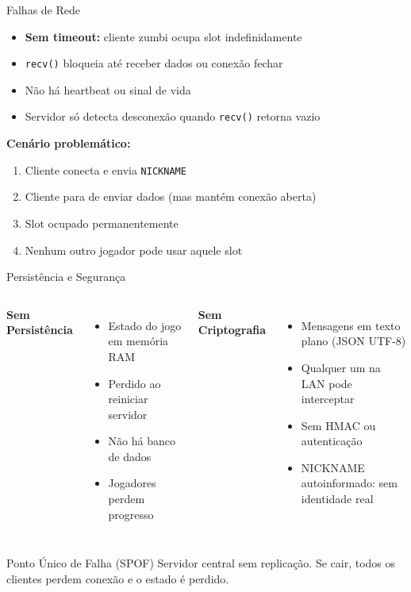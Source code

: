 \documentclass[aspectratio=169]{beamer}
\begin{document}
\begin{frame}{Falhas de Rede}
  \begin{itemize}
    \item \textbf{Sem timeout:} cliente zumbi ocupa slot indefinidamente
    \item \texttt{recv()} bloqueia at\'e receber dados ou conex\~ao fechar
    \item N\~ao h\'a heartbeat ou sinal de vida
    \item Servidor s\'o detecta desconex\~ao quando \texttt{recv()} retorna vazio
  \end{itemize}
  \vfill
  \textbf{Cen\'ario problem\'atico:}
  \begin{enumerate}
    \item Cliente conecta e envia \texttt{NICKNAME}
    \item Cliente para de enviar dados (mas mant\'em conex\~ao aberta)
    \item Slot ocupado permanentemente
    \item Nenhum outro jogador pode usar aquele slot
  \end{enumerate}
\end{frame}

\begin{frame}{Persist\^encia e Seguran\c{c}a}
  \begin{columns}
    \textbf{Sem Persist\^encia}
    \begin{itemize}
      \item Estado do jogo em mem\'oria RAM
      \item Perdido ao reiniciar servidor
      \item N\~ao h\'a banco de dados
      \item Jogadores perdem progresso
    \end{itemize}
    \textbf{Sem Criptografia}
    \begin{itemize}
      \item Mensagens em texto plano (JSON UTF-8)
      \item Qualquer um na LAN pode interceptar
      \item Sem HMAC ou autentica\c{c}\~ao
      \item NICKNAME autoinformado: sem identidade real
    \end{itemize}
  \end{columns}
  \vfill
  \begin{block}{Ponto \'Unico de Falha (SPOF)}
    Servidor central sem replica\c{c}\~ao. Se cair, todos os clientes perdem conex\~ao e o estado \'e perdido.
  \end{block}
\end{frame}
\end{document}
